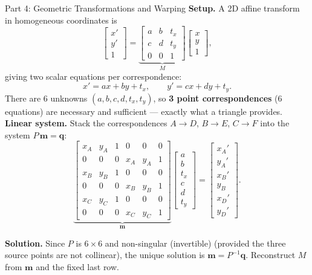 \documentclass[letterpaper]{article}
\begin{document}
\begin{notes}{Part 4: Geometric Transformations and Warping}
\textbf{Setup.} A 2D affine transform in homogeneous coordinates is
$$\begin{bmatrix}x'\\y'\\1\end{bmatrix} = \underbrace{\begin{bmatrix}a & b & t_x \\ c & d & t_y \\ 0 & 0 & 1\end{bmatrix}}_{M}\begin{bmatrix}x\\y\\1\end{bmatrix},$$
giving two scalar equations per correspondence:
$$x' = ax + by + t_x, \qquad y' = cx + dy + t_y.$$
There are 6 unknowns $(a,b,c,d,t_x,t_y)$, so \textbf{3 point correspondences} (6 equations) are necessary and sufficient --- exactly what a triangle provides.\\

\textbf{Linear system.} Stack the correspondences $A\!\to\!D$, $B\!\to\!E$, $C\!\to\!F$ into the system $P\,\mathbf{m} = \mathbf{q}$:
$$
\underbrace{
\begin{bmatrix}
x_A & y_A & 1 & 0   & 0   & 0 \\
0   & 0   & 0 & x_A & y_A & 1 \\
x_B & y_B & 1 & 0   & 0   & 0 \\
0   & 0   & 0 & x_B & y_B & 1 \\
x_C & y_C & 1 & 0   & 0   & 0 \\
0   & 0   & 0 & x_C & y_C & 1
\end{bmatrix}
}_{\mathbf{m}}
\begin{bmatrix}a\\b\\t_x\\c\\d\\t_y\end{bmatrix}
=
\begin{bmatrix}x_A'\\y_A'\\x_B'\\y_B\\x_D'\\y_D'\end{bmatrix}.$$

\textbf{Solution.} Since $P$ is $6\times6$ and non-singular (invertible) (provided the three source points are not collinear), the unique solution is $\mathbf{m} = P^{-1}\mathbf{q}$. Reconstruct $M$ from $\mathbf{m}$ and the fixed last row.


\end{notes}
\end{document}
